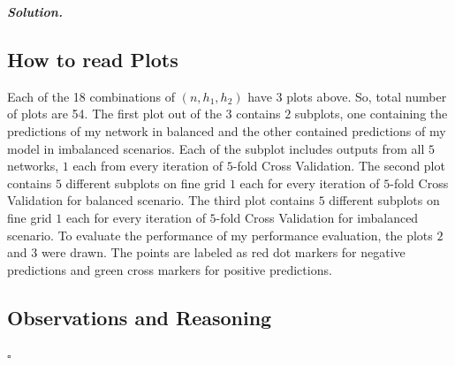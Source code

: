 \documentclass[10pt]{article}
\newenvironment{solution}[1][\it{Solution}]{\textbf{#1. } }{$\square$}
\begin{document}
\begin{solution}
\subsection*{How to read Plots}

Each of the 18 combinations of $(n, h_1, h_2)$ have 3 plots above. So, total number of plots are 54. The first plot out of the $3$ contains $2$ subplots, one containing the predictions of my network in balanced and the other contained predictions of my model in imbalanced scenarios. Each of the subplot includes outputs from all $5$ networks, $1$ each from every iteration of $5$-fold Cross Validation. The second plot contains $5$ different subplots on fine grid $1$ each for every iteration of $5$-fold Cross Validation for balanced scenario. The third plot contains $5$ different subplots on fine grid $1$ each for every iteration of $5$-fold Cross Validation for imbalanced scenario. To evaluate the performance of my performance evaluation, the plots $2$ and $3$ were drawn. The points are labeled as red dot markers for negative predictions and green cross markers for positive predictions.


\subsection*{Observations and Reasoning}


\end{solution}
\end{document}
